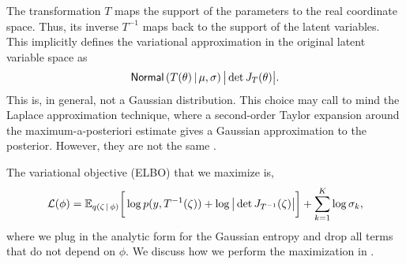 The transformation $T$ maps the support of the parameters to the real
coordinate space. Thus, its inverse $T^{-1}$ maps back to the support of the
latent variables. This implicitly defines the variational approximation in the
original latent variable space as
%
\[
\distro{Normal} \left(T(\theta) \, | \, \mu, \sigma\right)
\big| \det J_{T}(\theta) \big|.
\]
This is, in general, not a Gaussian distribution.
This choice may call to mind the Laplace approximation
technique, where a second-order Taylor expansion around the
maximum-a-posteriori estimate gives a Gaussian approximation to the
posterior. However, they are not the same \citep{Kucukelbir:2015}.

The variational objective (ELBO) that we maximize is,
\[
  \mathcal{L}(\phi)
  =
  \E_{q(\zeta\, | \,\phi)}
  \bigg[
  \log p (y, T^{-1}(\zeta))
  +
  \log \big| \det J_{T^{-1}}(\zeta) \big|
  \bigg]
  +
  \sum_{k=1}^K \log \sigma_k,
\]
where we plug in the analytic form for the Gaussian entropy and drop all terms
that do not depend on $\phi$. We discuss how we perform the maximization in
.























